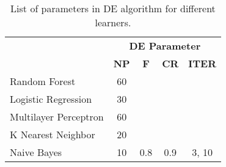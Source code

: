 
\begin{table}[!htbp]
\caption {List of parameters in DE algorithm for different learners.}
\centering
\begin{tabular}{l|c|c|c|c}
\hline
\rowcolor[HTML]{EFEFEF} 
\multicolumn{1}{c|}{\cellcolor[HTML]{EFEFEF}} & \multicolumn{4}{c}{\cellcolor[HTML]{EFEFEF}\textbf{DE Parameter}} \\ \cline{2-5} 
\rowcolor[HTML]{EFEFEF} 
\multicolumn{1}{c|}{\multirow{-2}{*}{\cellcolor[HTML]{EFEFEF}\textbf{Learner}}} & \textbf{NP} & \textbf{F} & \textbf{CR} & \textbf{ITER} \\ \hline
Random Forest & 60 &  &  &  \\ \cline{1-2}
Logistic Regression & 30 &  &  &  \\ \cline{1-2}
Multilayer Perceptron & 60 &  &  &  \\ \cline{1-2}
K Nearest Neighbor & 20 &  &  &  \\ \cline{1-2}
Naive Bayes & 10 & \multirow{-5}{*}{0.8} & \multirow{-5}{*}{0.9} & \multirow{-5}{*}{3, 10} \\ \hline
\end{tabular}
\label{tbl:DEpara}
\end{table}




